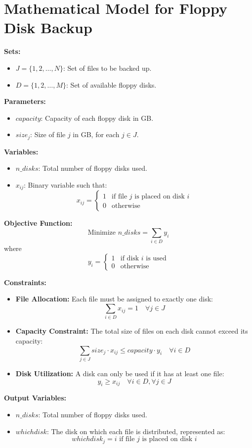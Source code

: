 \documentclass{article}
\begin{document}
\section*{Mathematical Model for Floppy Disk Backup}

\textbf{Sets:}
\begin{itemize}
    \item $J = \{1, 2, \ldots, N\}$: Set of files to be backed up.
    \item $D = \{1, 2, \ldots, M\}$: Set of available floppy disks.
\end{itemize}

\textbf{Parameters:}
\begin{itemize}
    \item $capacity$: Capacity of each floppy disk in GB.
    \item $size_j$: Size of file $j$ in GB, for each $j \in J$.
\end{itemize}

\textbf{Variables:}
\begin{itemize}
    \item $n\_disks$: Total number of floppy disks used.
    \item $x_{ij}$: Binary variable such that:
    \[
    x_{ij} = 
    \begin{cases} 
      1 & \text{if file } j \text{ is placed on disk } i \\
      0 & \text{otherwise} 
    \end{cases}
    \]
\end{itemize}

\textbf{Objective Function:}
\[
\text{Minimize } n\_disks = \sum_{i \in D} y_i
\]
where 
\[
y_i = 
\begin{cases} 
1 & \text{if disk } i \text{ is used} \\
0 & \text{otherwise} 
\end{cases}
\]

\textbf{Constraints:}
\begin{itemize}
    \item \textbf{File Allocation:} Each file must be assigned to exactly one disk:
    \[
    \sum_{i \in D} x_{ij} = 1 \quad \forall j \in J
    \]

    \item \textbf{Capacity Constraint:} The total size of files on each disk cannot exceed its capacity:
    \[
    \sum_{j \in J} size_j \cdot x_{ij} \leq capacity \cdot y_i \quad \forall i \in D
    \]

    \item \textbf{Disk Utilization:} A disk can only be used if it has at least one file:
    \[
    y_i \geq x_{ij} \quad \forall i \in D, \forall j \in J
    \]
\end{itemize}

\textbf{Output Variables:}
\begin{itemize}
    \item $n\_disks$: Total number of floppy disks used.
    \item $whichdisk$: The disk on which each file is distributed, represented as:
    \[
    whichdisk_j = i \text{ if file } j \text{ is placed on disk } i
    \]
\end{itemize}
\end{document}
